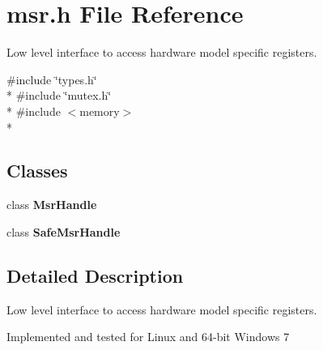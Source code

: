 \section{msr.\+h File Reference}
\label{msr_8h}


Low level interface to access hardware model specific registers.  


{\ttfamily \#include \char`\"{}types.\+h\char`\"{}}\\*
{\ttfamily \#include \char`\"{}mutex.\+h\char`\"{}}\\*
{\ttfamily \#include $<$memory$>$}\\*
\subsection*{Classes}
\begin{DoxyCompactItemize}
\item 
class {\bf Msr\+Handle}
\item 
class {\bf Safe\+Msr\+Handle}
\end{DoxyCompactItemize}


\subsection{Detailed Description}
Low level interface to access hardware model specific registers. 

Implemented and tested for Linux and 64-\/bit Windows 7 